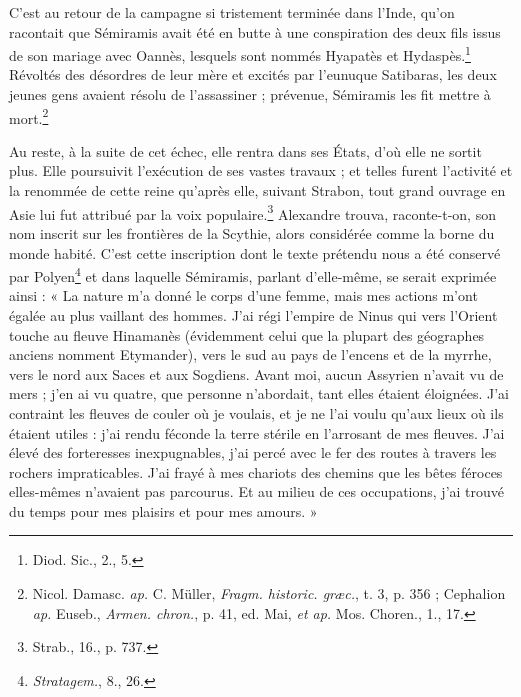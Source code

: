 \documentclass[a4paper, 11pt, oneside]{article}
\begin{document}
C'est au retour de la campagne si tristement terminée dans l'Inde, qu'on racontait que Sémiramis avait été en butte à une conspiration des deux fils issus de son mariage avec Oannès, lesquels sont nommés Hyapatès et Hydaspès.\footnote{Diod. Sic., 2., 5.} Révoltés des désordres de leur mère et excités par l'eunuque Satibaras, les deux jeunes gens avaient résolu de l'assassiner ; prévenue, Sémiramis les fit mettre à mort.\footnote{Nicol. Damasc. \emph{ap.} C. Müller, \emph{Fragm. historic. græc.}, t. 3, p. 356 ; Cephalion \emph{ap.} Euseb., \emph{Armen. chron.}, p. 41, ed. Mai, \emph{et ap.} Mos. Choren., 1., 17.}

Au reste, à la suite de cet échec, elle rentra dans ses États, d'où elle ne sortit plus. Elle poursuivit l'exécution de ses vastes travaux ; et telles furent l'activité et la renommée de cette reine qu'après elle, suivant Strabon, tout grand ouvrage en Asie lui fut attribué par la voix populaire.\footnote{Strab., 16., p. 737.} Alexandre trouva, raconte-t-on, son nom inscrit sur les frontières de la Scythie, alors considérée comme la borne du monde habité. C'est cette inscription dont le texte prétendu nous a été conservé par Polyen\footnote{\emph{Stratagem.}, 8., 26.} et dans laquelle Sémiramis, parlant d'elle-même, se serait exprimée ainsi : « La nature m'a donné le corps d'une femme, mais mes actions m'ont égalée au plus vaillant des hommes. J'ai régi l'empire de Ninus qui vers l'Orient touche au fleuve Hinamanès (évidemment celui que la plupart des géographes anciens nomment Etymander), vers le sud au pays de l'encens et de la myrrhe, vers le nord aux Saces et aux Sogdiens. Avant moi, aucun Assyrien n'avait vu de mers ; j'en ai vu quatre, que personne n'abordait, tant elles étaient éloignées. J'ai contraint les fleuves de couler où je voulais, et je ne l'ai voulu qu'aux lieux où ils étaient utiles : j'ai rendu féconde la terre stérile en l'arrosant de mes fleuves. J'ai élevé des forteresses inexpugnables, j'ai percé avec le fer des routes à travers les rochers impraticables. J'ai frayé à mes chariots des chemins que les bêtes féroces elles-mêmes n'avaient pas parcourus. Et au milieu de ces occupations, j'ai trouvé du temps pour mes plaisirs et pour mes amours. »
\end{document}
